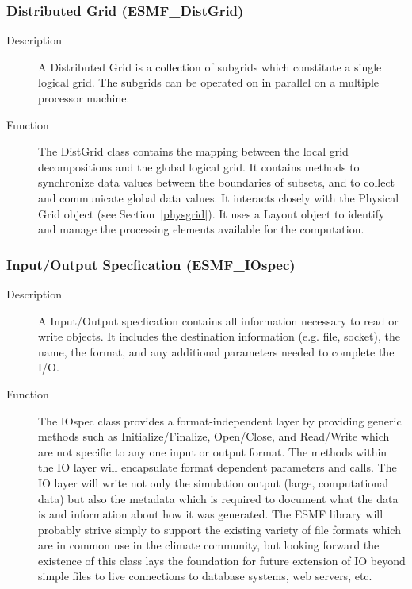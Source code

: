 \subsubsection{Distributed Grid (ESMF\_DistGrid)} 
\label{sec:distgrid} 
\begin{description}
\item [Description] A Distributed Grid is a collection of subgrids which
constitute a single logical grid.  The subgrids can be operated on in
parallel on a multiple processor machine.  
\item [Function] The DistGrid class contains the mapping
between the local grid decompositions and the global logical grid. 
It contains methods to 
synchronize data values between the boundaries of subsets, and to
collect and communicate global data values.  It interacts closely with
the Physical Grid object (see Section~\ref{physgrid}).
It uses a Layout object to identify and manage the processing elements 
available for the computation.
\end{description}

\subsubsection{Input/Output Specfication (ESMF\_IOspec)}
\label{sec:iospec} 
\begin{description}
\item [Description] A Input/Output specfication contains all 
information necessary to read or write objects.  It includes the 
destination information (e.g. file, socket), the name,
the format, and any additional parameters needed to complete the I/O.
\item [Function] The IOspec class provides a format-independent layer by
providing generic methods such as Initialize/Finalize, Open/Close, 
and Read/Write which are not specific to any one input or output format.
The methods
within the IO layer will encapsulate format dependent parameters and calls.
The IO layer will write not only the simulation output (large, computational
data) but also the metadata which is required to document what the data is
and information about how it was generated.
The ESMF library will probably strive simply to
support the existing variety of file formats which are in common use in
the climate community, but looking forward
the existence of this class lays the foundation for future extension 
of IO beyond simple files to live connections to database systems, 
web servers, etc.
\end{description}




